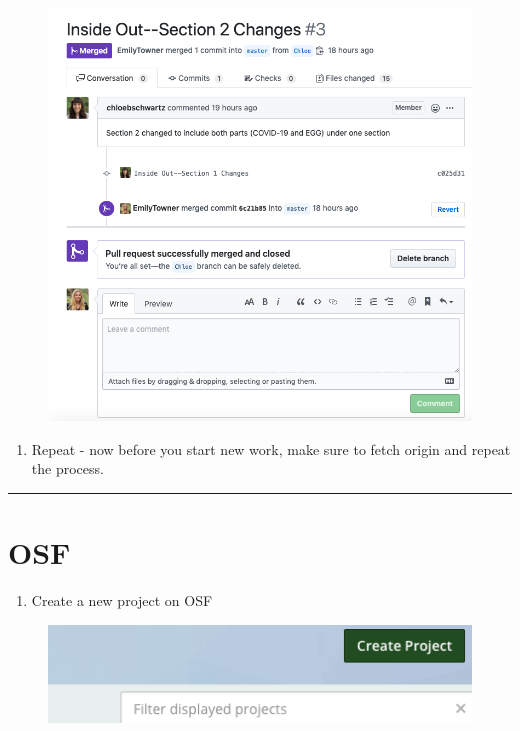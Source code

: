 \documentclass[]{book}
\providecommand{\tightlist}{%
  \setlength{\itemsep}{0pt}\setlength{\parskip}{0pt}}
\begin{document}
\begin{figure}
\centering
\includegraphics{images/research_protocols/github/28.png}
\caption{}
\end{figure}

\begin{enumerate}
\def\labelenumi{\arabic{enumi}.}
\setcounter{enumi}{7}
\tightlist
\item
  Repeat - now before you start new work, make sure to fetch origin and repeat the process.
\end{enumerate}

\begin{center}\rule{0.5\linewidth}{0.5pt}\end{center}

\hypertarget{osf}{%
\section{OSF}\label{osf}}

\begin{enumerate}
\def\labelenumi{\arabic{enumi}.}
\tightlist
\item
  Create a new project on OSF
\end{enumerate}

\begin{figure}
\centering
\includegraphics{images/research_protocols/osf/1.png}
\caption{}
\end{figure}
\end{document}
